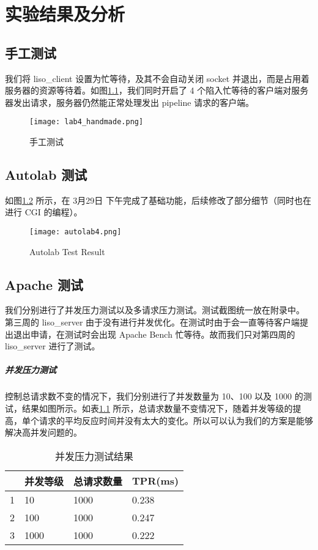 

\chapter{实验结果及分析}

\section{手工测试}
我们将 liso\_client 设置为忙等待，及其不会自动关闭 socket 并退出，而是占用着服务器的资源等待着。如图\ref{fig:lab4test1}，我们同时开启了 4 个陷入忙等待的客户端对服务器发出请求，服务器仍然能正常处理发出 pipeline 请求的客户端。


\begin{figure}[htbp!]
    \centering 
    \texttt{[image: lab4\_handmade.png]}
    \caption{手工测试}
    \label{fig:lab4test1}
\end{figure}

\section{Autolab 测试} 如图\ref{fig:autolab4} 所示，在 3月29日 下午完成了基础功能，后续修改了部分细节（同时也在进行 CGI 的编程）。

\begin{figure}[htbp!]
    \centering
    \texttt{[image: autolab4.png]}
    \caption{Autolab Test Result}\label{fig:autolab4}
\end{figure}

\section{Apache 测试} 
我们分别进行了并发压力测试以及多请求压力测试。测试截图统一放在附录中。
第三周的 liso\_server 由于没有进行并发优化。在测试时由于会一直等待客户端提出退出申请，在测试时会出现 Apache Bench 忙等待。故而我们只对第四周的 liso\_server 进行了测试。

\paragraph*{并发压力测试} 控制总请求数不变的情况下，我们分别进行了并发数量为 10、100 以及 1000 的测试，结果如图所示。如表\ref{tab:parallel} 所示，总请求数量不变情况下，随着并发等级的提高，单个请求的平均反应时间并没有太大的变化。所以可以认为我们的方案是能够解决高并发问题的。

\begin{table}[htbp!]
    \centering
    \begin{tabular}{llll}\hline
      & 并发等级 & 总请求数量 & TPR(ms)   \\\hline
    1 & 10   & 1000  & 0.238 \\
    2 & 100  & 1000  & 0.247 \\
    3 & 1000 & 1000  & 0.222\\
    \hline
    \end{tabular}
    \caption{并发压力测试结果}\label{tab:parallel}
\end{table}

